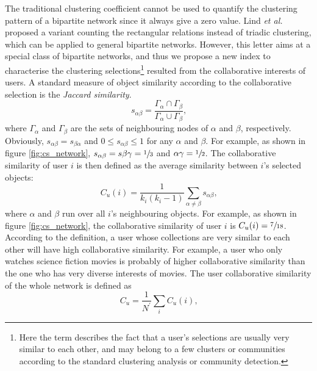       The traditional clustering coefficient\cite{WattsStrogatz1998} cannot be used to quantify the clustering pattern of a bipartite network since it always give a zero value. Lind \textit{et al.}\cite{LindGonzalezHerrmann2005} proposed a variant counting the rectangular relations instead of triadic clustering, which can be applied to general bipartite networks. However, this letter aims at a special class of bipartite networks, and thus we propose a new index to characterise the clustering selections\footnote{Here the term  describes the fact that a user's selections are usually very similar to each other, and may belong to a few clusters or communities according to the standard clustering analysis or community detection.} resulted from the collaborative interests of users. A standard measure of object similarity according to the collaborative selection is the \emph{Jaccard similarity}\cite{Jaccard1901}.
      \begin{equation}
        s_{\alpha\beta} = \frac{\Gamma_\alpha \cap \Gamma_\beta}{\Gamma_\alpha \cup \Gamma_\beta}\mbox{,}
      \end{equation}
      where $\Gamma_\alpha$ and $\Gamma_\beta$ are the sets of neighbouring nodes of $\alpha$ and $\beta$, respectively. Obviously, $s_{\alpha\beta} = s_{\beta\alpha}$ and $0 \leq s_{\alpha\beta} \leq 1$ for any $\alpha$ and $\beta$. For example, as shown in figure \ref{fig:cs_network}, $s_{\alpha\beta} = s{\beta\gamma} = \sfrac{1}{3}$ and ${\alpha\gamma} = \sfrac{1}{2}$. The collaborative similarity of user $i$ is then defined as the average similarity between $i$'s selected objects:
      \begin{equation}
        C_u(i) = \frac{1}{k_i(k_i-1)} \sum_{\alpha\neq\beta} s_{\alpha\beta}\mbox{,}
      \end{equation}
      where $\alpha$ and $\beta$ run over all $i$'s neighbouring objects. For example, as shown in figure \ref{fig:cs_network}, the collaborative similarity of user $i$ is $C_u(i) = \sfrac{7}{18}$. According to the definition, a user whose collections are very similar to each other will have high collaborative similarity. For example, a user who only watches science fiction movies is probably of higher collaborative similarity than the one who has very diverse interests of movies. The user collaborative similarity of the whole network is defined as
      \begin{equation}
        C_u = \frac{1}{N^\prime} \sum_{i} C_u(i)\mbox{,}
      \end{equation}

